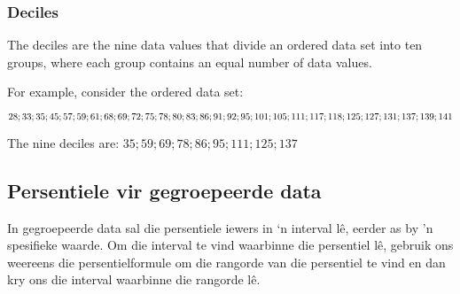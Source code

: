 \subsubsection*{Deciles}
The deciles are the nine data values that divide an ordered data set into ten groups, where each group contains an equal number of data values.
\par
For example, consider the ordered data set:
\begin{center}
$28; 33; 35; 45; 57; 59; 61; 68; 69; 72; 75; 78; 80; 83; 86; 91; 92; \\
95; 101; 105; 111; 117; 118; 125; 127; 131; 137; 139; 141$\\
\end{center}
The nine deciles are: $35; 59; 69; 78; 86; 95; 111; 125; 137$


\subsection{Persentiele vir gegroepeerde data}

In gegroepeerde data sal die persentiele iewers in ‘n interval lê, eerder as by ’n spesifieke waarde. Om die interval te vind waarbinne die persentiel lê, gebruik ons weereens die persentielformule om die rangorde van die persentiel te vind en dan kry ons die interval waarbinne die rangorde l\^e.

